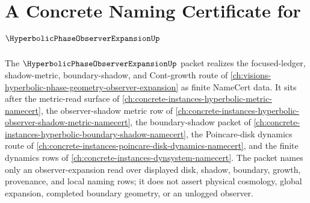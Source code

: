 \chapter{A Concrete Naming Certificate for $\HyperbolicPhaseObserverExpansionUp$}
\label{ch:concrete-instances-hyperbolic-phase-observer-expansion-namecert}

The $\HyperbolicPhaseObserverExpansionUp$ packet realizes the focused-ledger, shadow-metric, boundary-shadow, and Cont-growth route of \autoref{ch:visions-hyperbolic-phase-geometry-observer-expansion} as finite NameCert data. It sits after the metric-read surface of \autoref{ch:concrete-instances-hyperbolic-metric-namecert}, the observer-shadow metric row of \autoref{ch:concrete-instances-hyperbolic-observer-shadow-metric-namecert}, the boundary-shadow packet of \autoref{ch:concrete-instances-hyperbolic-boundary-shadow-namecert}, the Poincare-disk dynamics route of \autoref{ch:concrete-instances-poincare-disk-dynamics-namecert}, and the finite dynamics rows of \autoref{ch:concrete-instances-dynsystem-namecert}. The packet names only an observer-expansion read over displayed disk, shadow, boundary, growth, provenance, and local naming rows; it does not assert physical cosmology, global expansion, completed boundary geometry, or an unlogged observer.

